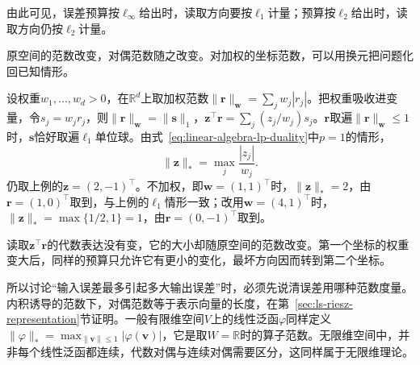 由此可见，误差预算按$\ell_\infty$给出时，读取方向要按$\ell_1$计量；预算按$\ell_2$给出时，读取方向仍按$\ell_2$计量。

原空间的范数改变，对偶范数随之改变。对加权的坐标范数，可以用换元把问题化回已知情形。
\begin{example}
\label{ex:ls-weighted-dual-norm}
设权重$w_1,\ldots,w_d>0$，在$\mathbb R^d$上取加权范数$\lVert\bm r\rVert_{\bm w}=\sum_jw_j|r_j|$。把权重吸收进变量，令$s_j=w_jr_j$，则$\lVert\bm r\rVert_{\bm w}=\lVert\bm s\rVert_1$，$\bm z^\top\bm r=\sum_j(z_j/w_j)s_j$。$\bm r$取遍$\lVert\bm r\rVert_{\bm w}\leq1$时，$\bm s$恰好取遍$\ell_1$单位球。由式~\eqref{eq:linear-algebra-lp-duality}中$p=1$的情形，
\[
 \lVert\bm z\rVert_*=\max_j\frac{|z_j|}{w_j}.
\]
仍取上例的$\bm z=(2,-1)^\top$。不加权，即$\bm w=(1,1)^\top$时，$\lVert\bm z\rVert_*=2$，由$\bm r=(1,0)^\top$取到，与上例的$\ell_1$情形一致；改用$\bm w=(4,1)^\top$时，$\lVert\bm z\rVert_*=\max\{1/2,1\}=1$，由$\bm r=(0,-1)^\top$取到。

读取$\bm z^\top\bm r$的代数表达没有变，它的大小却随原空间的范数改变。第一个坐标的权重变大后，同样的预算只允许它有更小的变化，最坏方向因而转到第二个坐标。
\end{example}
所以讨论“输入误差最多引起多大输出误差”时，必须先说清误差用哪种范数度量。内积诱导的范数下，对偶范数等于表示向量的长度，在第~\ref{sec:ls-riesz-representation}节证明。一般有限维空间$V$上的线性泛函$\varphi$同样定义$\lVert\varphi\rVert_*=\max_{\lVert\bm v\rVert\leq1}|\varphi(\bm v)|$，它是取$W=\mathbb R$时的算子范数。无限维空间中，并非每个线性泛函都连续，代数对偶与连续对偶需要区分，这同样属于无限维理论。
